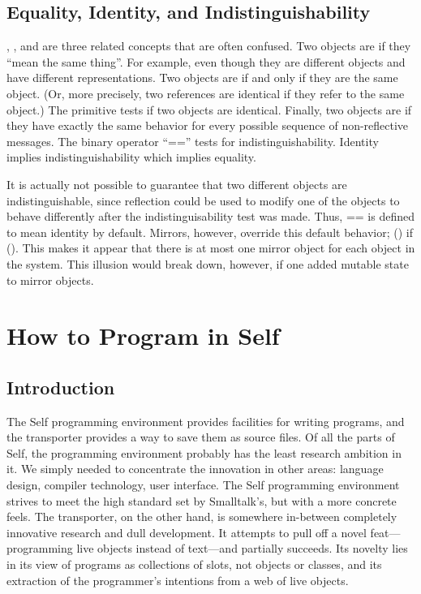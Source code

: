 \documentclass[letterpaper,10pt,english]{sphinxmanual}
\begin{document}
\section{Equality, Identity, and Indistinguishability}
\label{\detokenize{progguid:equality-identity-and-indistinguishability}}
, , and  are three related concepts that are often confused. Two
objects are  if they “mean the same thing”. For example,  even though they are different
objects and have different representations. Two objects are  if and only if they are
the same object. (Or, more precisely, two references are identical if they refer to the same object.)
The primitive  tests if two objects are identical. Finally, two objects are  if
they have exactly the same behavior for every possible sequence of non-reflective messages. The
binary operator “==” tests for indistinguishability. Identity implies indistinguishability which implies
equality.

It is actually not possible to guarantee that two different objects are indistinguishable, since reflection
could be used to modify one of the objects to behave differently after the indistinguisability
test was made. Thus, == is defined to mean identity by default. Mirrors, however, override this default
behavior; () if (). This makes it appear
that there is at most one mirror object for each object in the system. This illusion would break
down, however, if one added mutable state to mirror objects.


\chapter{How to Program in Self}
\label{\detokenize{howtoprg:how-to-program-in-self}}\label{\detokenize{howtoprg::doc}}

\section{Introduction}
\label{\detokenize{howtoprg:introduction}}
The Self programming environment provides facilities for writing programs, and the transporter
provides a way to save them as source files. Of all the parts of Self, the programming environment
probably has the least research ambition in it. We simply needed to concentrate the innovation in
other areas: language design, compiler technology, user interface. The Self programming environment
strives to meet the high standard set by Smalltalk’s, but with a more concrete feels. The transporter,
on the other hand, is somewhere in-between completely innovative research and dull
development. It attempts to pull off a novel feat—programming live objects instead of text—and
partially succeeds. Its novelty lies in its view of programs as collections of slots, not objects or
classes, and its extraction of the programmer's intentions from a web of live objects.
\end{document}
